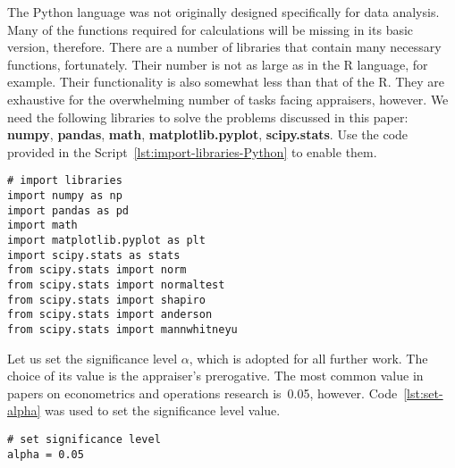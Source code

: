\documentclass[]{scrreprt}
\begin{document}
The Python language was not originally designed specifically for data analysis. Many of the functions required for calculations will be missing in its basic version, therefore. There are a number of libraries that contain many necessary functions, fortunately. Their number is not as large as in the R language, for example. Their functionality is also somewhat less than that of the R. They are exhaustive for the overwhelming number of tasks facing appraisers, however. We need the following libraries to solve the problems discussed in this paper: \textbf{numpy}, \textbf{pandas},\textbf{ math}, \textbf{matplotlib.pyplot}, \textbf{scipy.stats}. Use the code provided in the Script~\ref{lst:import-libraries-Python} to enable them.
\begin{lstlisting}[float=htp, caption = Enabling the required libraries, firstnumber=1, label= lst:import-libraries-Python]
# import libraries
import numpy as np
import pandas as pd
import math
import matplotlib.pyplot as plt
import scipy.stats as stats
from scipy.stats import norm
from scipy.stats import normaltest
from scipy.stats import shapiro
from scipy.stats import anderson
from scipy.stats import mannwhitneyu
\end{lstlisting}
%

Let us set the significance level $\alpha$, which is adopted for all further work. The choice of its value is the appraiser's prerogative. The most common value in papers on econometrics and operations research is~0.05, however. Code~\ref{lst:set-alpha} was used to set the significance level value.
%
\begin{lstlisting}[float=htp, caption = Set the applicable level of significance, firstnumber=1, label= lst:set-alpha]
# set significance level
alpha = 0.05
\end{lstlisting}
% 
\end{document}
